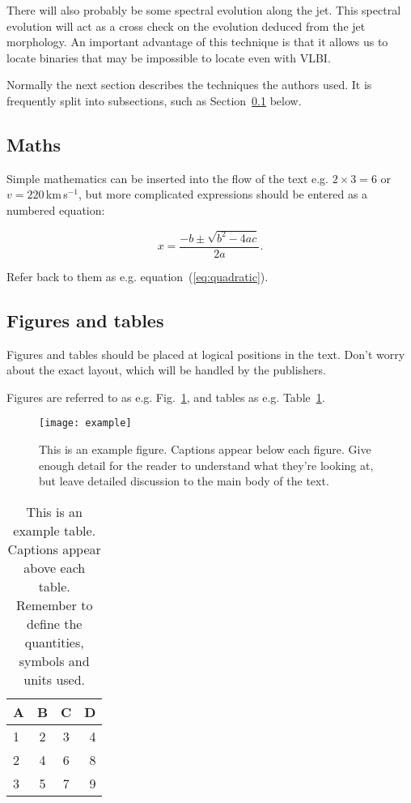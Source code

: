 There will also probably be some spectral evolution along the jet.
This spectral evolution will act as a cross check on the evolution
deduced from the jet morphology.  An important advantage of this
technique is that it allows us to locate binaries that may be
impossible to locate even with VLBI.


Normally the next section describes the techniques the authors used.
It is frequently split into subsections, such as Section~\ref{sec:maths} below.

\subsection{Maths}
\label{sec:maths} %

Simple mathematics can be inserted into the flow of the text e.g. $2\times3=6$
or $v=220$\,km\,s$^{-1}$, but more complicated expressions should be entered
as a numbered equation:

\begin{equation}
    x=\frac{-b\pm\sqrt{b^2-4ac}}{2a}.
	\label{eq:quadratic}
\end{equation}

Refer back to them as e.g. equation~(\ref{eq:quadratic}).

\subsection{Figures and tables}

Figures and tables should be placed at logical positions in the text. Don't
worry about the exact layout, which will be handled by the publishers.

Figures are referred to as e.g. Fig.~\ref{fig:example_figure}, and tables as
e.g. Table~\ref{tab:example_table}.

\begin{figure}
	\texttt{[image: example]}
    \caption{This is an example figure. Captions appear below each figure.
	Give enough detail for the reader to understand what they're looking at,
	but leave detailed discussion to the main body of the text.}
    \label{fig:example_figure}
\end{figure}

\begin{table}
	\centering
	\caption{This is an example table. Captions appear above each table.
	Remember to define the quantities, symbols and units used.}
	\label{tab:example_table}
	\begin{tabular}{lccr} %
		\hline
		A & B & C & D\\
		\hline
		1 & 2 & 3 & 4\\
		2 & 4 & 6 & 8\\
		3 & 5 & 7 & 9\\
		\hline
	\end{tabular}
\end{table}


